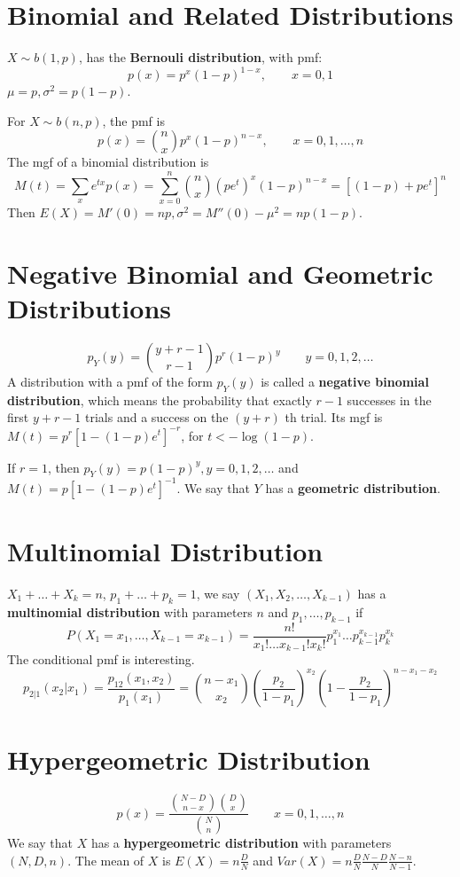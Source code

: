 \section{Binomial and Related Distributions}

$X\sim b(1,p)$, has the \textbf{Bernouli distribution}, with pmf:
\[
p(x)=p^{x}(1-p)^{1-x},\qquad x=0,1
\]
$\mu=p, \sigma^{2}=p(1-p)$.

For $X\sim b(n,p)$, the pmf is
\[
p(x)={\binom{n}{x} }p^{x}(1-p)^{n-x},\qquad x=0,1,\dots,n
\]
The mgf of a binomial distribution is
\[
M(t)=\sum_{x}e^{ tx }p(x)=\sum_{x=0}^{n}{\binom{n}{x} }(pe^{ t })^{x}(1-p)^{n-x}=[(1-p)+pe^{ t }]^{n}
\]
Then $E(X)=M'(0)=np,\sigma^{2}=M''(0)-\mu^{2}=np(1-p)$.

\section{Negative Binomial and Geometric Distributions}
\[
p_{Y}(y)={\binom{y+r-1}{r-1} }p^{r}(1-p)^{y}\qquad y=0,1,2,\dots
\]
A distribution with a pmf of the form $p_{Y}(y)$ is called a \textbf{negative binomial distribution}, which means the probability that exactly $r-1$ successes in the first $y+r-1$ trials and a success on the $(y+r)$ th trial. Its mgf is $M(t)=p^{r}[1-(1-p)e^{ t }]^{-r}$, for $t<-\log(1-p)$.

If $r=1$, then $p_{Y}(y)=p(1-p)^{y},y=0,1,2,\dots$ and $M(t)=p[1-(1-p)e^{ t }]^{-1}$. We say that $Y$ has a \textbf{geometric distribution}.

\section{Multinomial Distribution}

$X_1+\dots+X_k=n$, $p_1+\dots+p_k=1$, we say $(X_1,X_2,\dots,X_{k-1})$ has a \textbf{multinomial distribution} with parameters $n$ and $p_1,\dots,p_{k-1}$ if
\[
P(X_1=x_1,\dots,X_{k-1}=x_{k-1})=\frac{n!}{x_1!\dots x_{k-1}!x_k!}p_1^{x_1}\dots p_{k-1}^{x_{k-1}}p_k^{x_k}
\]
The conditional pmf is interesting.
\[
p_{2|1}(x_2|x_1)=\frac{p_{12}(x_1,x_2)}{p_1(x_1)}={\binom{n-x_1}{x_2} }\left( \frac{p_2}{1-p_1} \right)^{x_2}\left( 1-\frac{p_2}{1-p_1} \right)^{n-x_1-x_2}
\]
\section{Hypergeometric Distribution}
\[
p(x)=\frac{\binom{N-D}{n-x} \binom{D}{x} }{\binom{N}{n} }\qquad x=0,1,\dots,n
\]
We say that $X$ has a \textbf{hypergeometric distribution} with parameters $(N,D,n)$. The mean of $X$ is $E (X)=n \frac{D}{N}$ and $Var(X)=n\frac{D}{N}\frac{N-D}{N}\frac{N-n}{N-1}$.


